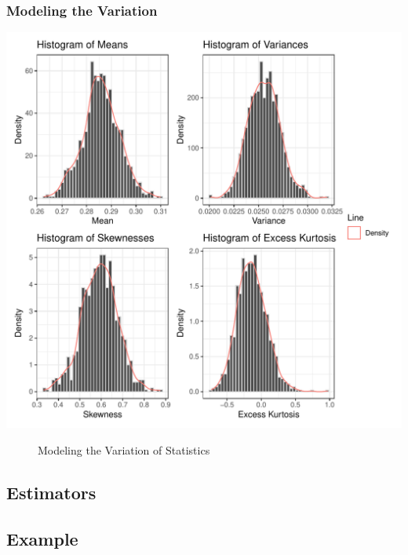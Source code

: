 \documentclass{article}\usepackage[]{graphicx}\usepackage[]{xcolor}
\makeatletter
\def\maxwidth{ %
  \ifdim\Gin@nat@width>\linewidth
    \linewidth
  \else
    \Gin@nat@width
  \fi
}
\newenvironment{knitrout}{}{} %
\makeatother
\begin{document}
\subsubsection{Modeling the Variation}
\begin{knitrout}\scriptsize
{}\color{fgcolor}
\includegraphics[width=\maxwidth]{figure/plot4-1} 
\end{knitrout}
\begin{figure}[H]
\begin{center}

\caption{Modeling the Variation of Statistics}
\label{variation} %
\end{center}
\end{figure}

\pagebreak
\subsection{Estimators}
\subsection{Example}
\end{document}

